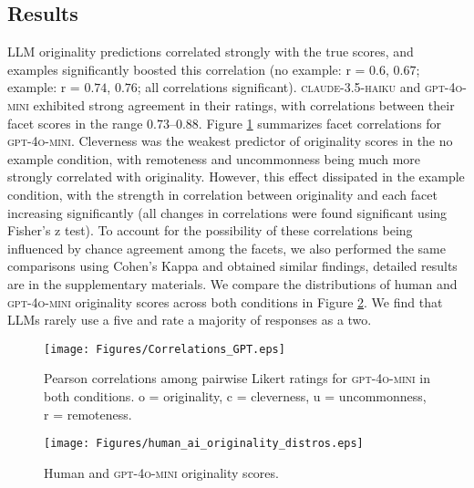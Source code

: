 \subsection{Results}
LLM originality predictions correlated strongly with the true scores, and examples significantly boosted this correlation (no example: r = $0.6$, $0.67$; example: r = $0.74$, $0.76$; all correlations significant). \textsc{claude-3.5-haiku} and \textsc{gpt-4o-mini} exhibited strong agreement in their ratings, with correlations between their facet scores in the range $0.73$--$0.88$. Figure \ref{fig:experiment_2_gpt_correlations} summarizes facet correlations for \textsc{gpt-4o-mini}. Cleverness was the weakest predictor of originality scores in the no example condition, with remoteness and uncommonness being much more strongly correlated with originality. However, this effect dissipated in the example condition, with the strength in correlation between originality and each facet increasing significantly (all changes in correlations were found significant using Fisher's z test). To account for the possibility of these correlations being influenced by chance agreement among the facets, we also performed the same comparisons using Cohen's Kappa and obtained similar findings, detailed results are in the supplementary materials. We compare the distributions of human and \textsc{gpt-4o-mini} originality scores across both conditions in Figure \ref{fig:originality_distros}. We find that LLMs rarely use a five and rate a majority of responses as a two. 

\begin{figure}[htb]
    \centering
    \footnotesize
    \texttt{[image: Figures/Correlations\_GPT.eps]}
    \caption{Pearson correlations among pairwise Likert ratings for \textsc{gpt-4o-mini} in both conditions. o = originality, c = cleverness, u = uncommonness, r = remoteness.}
    \label{fig:experiment_2_gpt_correlations}
\end{figure}

\begin{figure}[htb]
    \centering
    \footnotesize
    \texttt{[image: Figures/human\_ai\_originality\_distros.eps]}
    \caption{Human and \textsc{gpt-4o-mini} originality scores.}
    \label{fig:originality_distros}
\end{figure}

